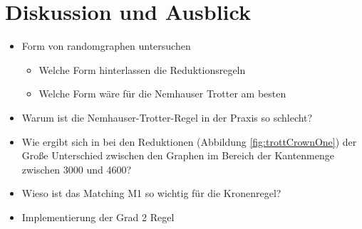 
\chapter{Diskussion und Ausblick}
\label{ch:fazit}

\begin{itemize}
\item Form von randomgraphen untersuchen
	\begin{itemize}
	\item Welche Form hinterlassen die Reduktionsregeln
	\item Welche Form wäre für die Nemhauser Trotter am besten
	\end{itemize}
\item Warum ist die Nemhauser-Trotter-Regel in der Praxis so schlecht?
\item Wie ergibt sich in bei den Reduktionen (Abbildung \ref{fig:trottCrownOne}) der Große Unterschied zwischen den Graphen im Bereich der Kantenmenge zwischen 3000 und 4600?
\item Wieso ist das Matching M1 so wichtig für die Kronenregel?
\item Implementierung der Grad 2 Regel
\end{itemize}

